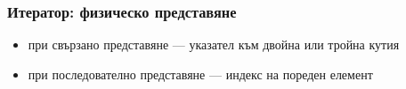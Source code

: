 \documentclass[alsotrans]{beamerswitch}
\begin{document}
\begin{frame}
  \frametitle{Итератор: физическо представяне}

  \begin{itemize}
  \item при свързано представяне --- указател към двойна или тройна кутия
  \item при последователно представяне --- индекс на пореден елемент
  \end{itemize}
\end{frame}

\end{document}
